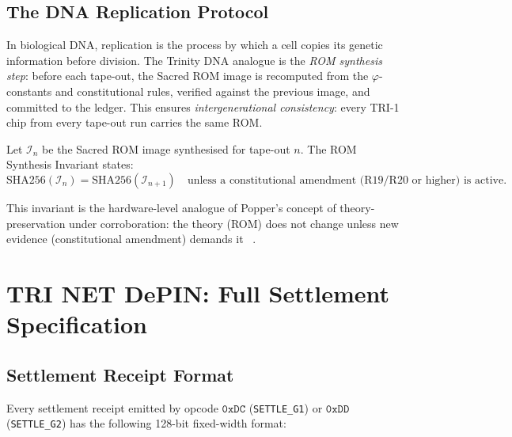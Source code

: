 \subsection{The DNA Replication Protocol}
\label{sec74:dna-replication}

In biological DNA, replication is the process by which a cell copies its
genetic information before division.  The Trinity DNA analogue is the
\emph{ROM synthesis step}: before each tape-out, the Sacred ROM image is
recomputed from the $\varphi$-constants and constitutional rules, verified
against the previous image, and committed to the ledger.  This ensures
\emph{intergenerational consistency}: every TRI-1 chip from every tape-out
run carries the same ROM.

\begin{definition}
\label{def74:rom-replication}
Let $\mathcal{I}_{n}$ be the Sacred ROM image synthesised for tape-out $n$.
The ROM Synthesis Invariant states:
\[
  \mathrm{SHA256}(\mathcal{I}_{n}) = \mathrm{SHA256}(\mathcal{I}_{n+1})
  \quad \text{unless a constitutional amendment (R19/R20 or higher) is active.}
\]
\end{definition}

This invariant is the hardware-level analogue of Popper's concept of
theory-preservation under corroboration: the theory (ROM) does not change
unless new evidence (constitutional amendment) demands it
~\cite{popper1959}.

\section{TRI NET DePIN: Full Settlement Specification}
\label{sec74:depin-full}

\subsection{Settlement Receipt Format}
\label{sec74:receipt-format}

Every settlement receipt emitted by opcode $\mathtt{0xDC}$
(\texttt{SETTLE\_G1}) or $\mathtt{0xDD}$ (\texttt{SETTLE\_G2}) has the
following 128-bit fixed-width format:

